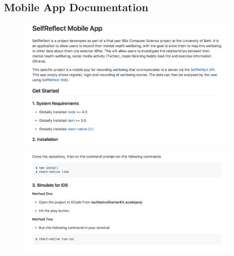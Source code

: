 \documentclass[11pt,openright,a4paper]{report}
\begin{document}
\begin{appendices}
\newpage
\section{Mobile App Documentation} \label{app:mobiledocs}
\begin{figure}[ht]
  \centering
  \includegraphics[width=.9\textwidth]{i/mobiledocs1.png}
\end{figure}

\begin{figure}[ht]
  \centering
  \includegraphics[width=.9\textwidth]{i/mobiledocs2.png}
\end{figure}

\newpage

\end{appendices}
\end{document}
